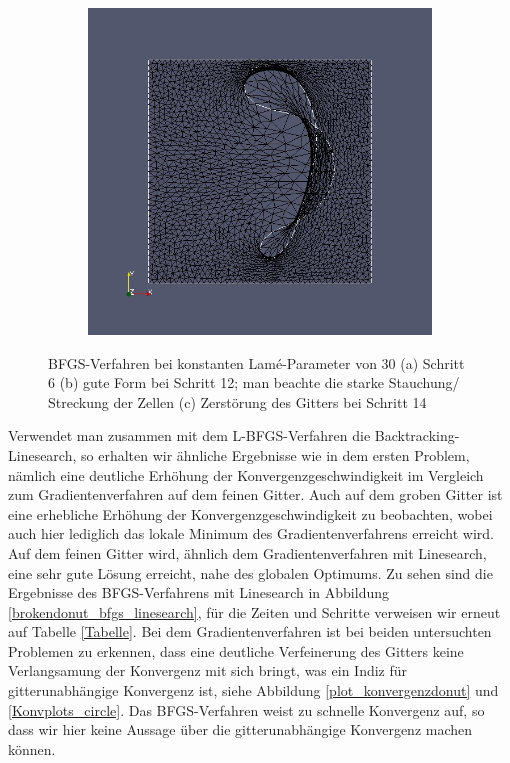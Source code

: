 \begin{figure}
\begin{subfigure}{0.315\textwidth}
	\caption{}	
	\end{subfigure}
	\begin{subfigure}{0.315\textwidth}
	\centering
	\includegraphics[scale=0.21]{pic_brokendonut_bfgs_konstlame_14.jpg}
	\caption{}	
	\end{subfigure}
\caption{BFGS-Verfahren bei konstanten Lamé-Parameter von 30 (a) Schritt 6 (b) gute Form bei Schritt 12; man beachte die starke Stauchung/ Streckung der Zellen (c) Zerstörung des Gitters bei Schritt 14}
\label{brokendonut_bfgs_konstlame}
\end{figure}

Verwendet man zusammen mit dem L-BFGS-Verfahren die Backtracking-Linesearch, so erhalten wir ähnliche Ergebnisse wie in dem ersten Problem, nämlich eine deutliche Erhöhung der Konvergenzgeschwindigkeit im Vergleich zum Gradientenverfahren auf dem feinen Gitter. Auch auf dem groben Gitter ist eine erhebliche Erhöhung der Konvergenzgeschwindigkeit zu beobachten, wobei auch hier lediglich das lokale Minimum des Gradientenverfahrens erreicht wird. Auf dem feinen Gitter wird, ähnlich dem Gradientenverfahren mit Linesearch, eine sehr gute Lösung erreicht, nahe des globalen Optimums. Zu sehen sind die Ergebnisse des BFGS-Verfahrens mit Linesearch in Abbildung \ref{brokendonut_bfgs_linesearch}, für die Zeiten und Schritte verweisen wir erneut auf Tabelle \ref{Tabelle}. Bei dem Gradientenverfahren ist bei beiden untersuchten Problemen zu erkennen, dass eine deutliche Verfeinerung des Gitters keine Verlangsamung der Konvergenz mit sich bringt, was ein Indiz für gitterunabhängige Konvergenz ist, siehe Abbildung \ref{plot_konvergenzdonut} und \ref{Konvplots_circle}. Das BFGS-Verfahren weist zu schnelle Konvergenz auf, so dass wir hier keine Aussage über die gitterunabhängige Konvergenz machen können. 

